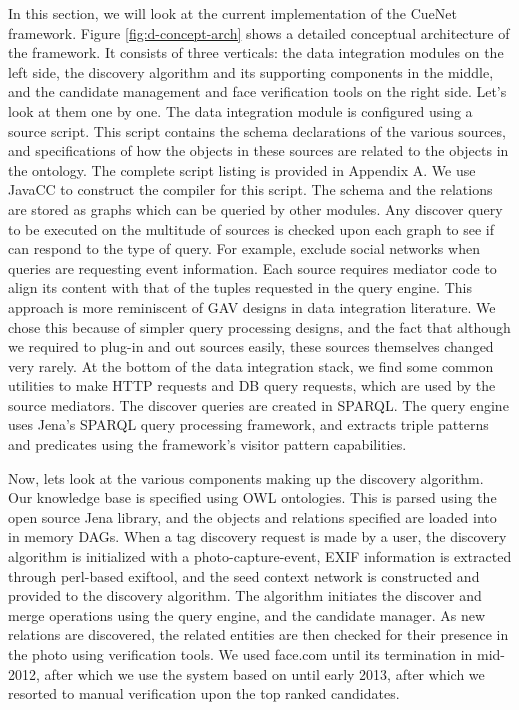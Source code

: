 In this section, we will look at the current implementation of the CueNet framework. Figure \ref{fig:d-concept-arch} shows a detailed conceptual architecture of the framework. It consists of three verticals: the data integration modules on the left side, the discovery algorithm and its supporting components in the middle, and the candidate management and face verification tools on the right side. Let's look at them one by one. The data integration module is configured using a source script. This script contains the schema declarations of the various sources, and specifications of how the objects in these sources are related to the objects in the ontology. The complete script listing is provided in Appendix A. We use JavaCC to construct the compiler for this script. The schema and the relations are stored as graphs which can be queried by other modules. Any discover query to be executed on the multitude of sources is checked upon each graph to see if can respond to the type of query. For example, exclude social networks when queries are requesting event information. Each source requires mediator code to align its content with that of the tuples requested in the query engine. This approach is more reminiscent of GAV designs in data integration literature. We chose this because of simpler query processing designs, and the fact that although we required to plug-in and out sources easily, these sources themselves changed very rarely. At the bottom of the data integration stack, we find some common utilities to make HTTP requests and DB query requests, which are used by the source mediators. The discover queries are created in SPARQL. The query engine uses Jena's SPARQL query processing framework, and extracts triple patterns and predicates using the framework's visitor pattern capabilities.

Now, lets look at the various components making up the discovery algorithm. Our knowledge base is specified using OWL ontologies. This is parsed using the open source Jena library, and the objects and relations specified are loaded into in memory DAGs. When a tag discovery request is made by a user, the discovery algorithm is initialized with a photo-capture-event, EXIF information is extracted through perl-based exiftool, and the seed context network is constructed and provided to the discovery algorithm. The algorithm initiates the discover and merge operations using the query engine, and the candidate manager. As new relations are discovered, the related entities are then checked for their presence in the photo using verification tools. We used face.com until its termination in mid-2012, after which we use the system based on \cite{nk_attribute_classifiers} until early 2013, after which we resorted to manual verification upon the top ranked candidates.


